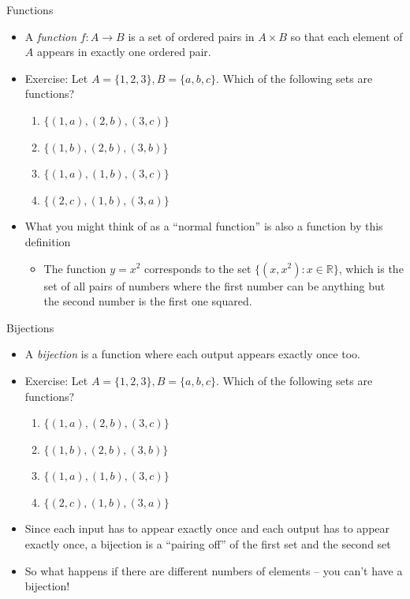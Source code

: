 \documentclass{beamer}
\begin{document}
\begin{frame}{Functions}
\begin{itemize}
\item A \emph{function} $f:A\to B$ is a set of ordered pairs in $A\times B$ so that each element of $A$ appears in exactly one ordered pair.
\item Exercise: Let $A = \{1,2,3\}, B = \{a,b,c\}$. Which of the following sets are functions?
\begin{enumerate}
\item $\{(1,a), (2,b), (3,c)\}$
\item $\{(1,b), (2,b), (3,b)\}$
\item $\{(1,a), (1,b), (3,c)\}$
\item $\{(2,c), (1,b), (3,a)\}$
\end{enumerate}
\item What you might think of as a ``normal function'' is also a function by this definition
\begin{itemize}
\item The function $y = x^2$ corresponds to the set $\{(x,x^2): x\in\mathbb{R}\}$, which is the set of all pairs of numbers where the first number can be anything but the second number is the first one squared.
\end{itemize}
\end{itemize}
\end{frame}

\begin{frame}{Bijections}
\begin{itemize}
\item A \emph{bijection} is a function where each output appears exactly once too.
\item Exercise: Let $A = \{1,2,3\}, B = \{a,b,c\}$. Which of the following sets are functions?
\begin{enumerate}
\item $\{(1,a), (2,b), (3,c)\}$
\item $\{(1,b), (2,b), (3,b)\}$
\item $\{(1,a), (1,b), (3,c)\}$
\item $\{(2,c), (1,b), (3,a)\}$
\end{enumerate}
\item Since each input has to appear exactly once and each output has to appear exactly once, a bijection is a ``pairing off'' of the first set and the second set
\item So what happens if there are different numbers of elements -- you can't have a bijection!
\end{itemize}
\end{frame}
\end{document}
